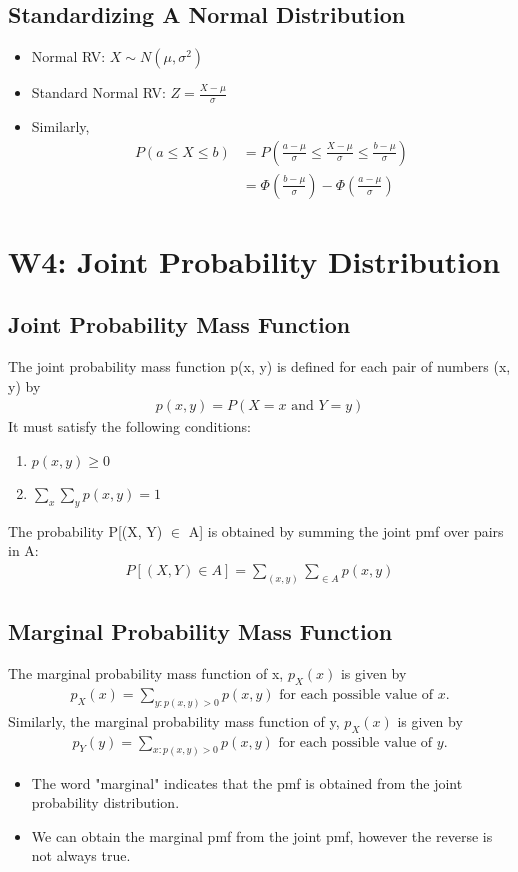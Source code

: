 \documentclass[a4paper]{article}
\begin{document}
\subsection{Standardizing A Normal Distribution}
\begin{itemize}
    \item Normal RV: $X \sim N(\mu, \sigma^{2})$
    \item Standard Normal RV: $Z = \frac{X-\mu}{\sigma}$ 
    \item Similarly,
    \begin{align*}
        P(a \leq X \leq b) &= P\left(\frac{a-\mu}{\sigma}\leq \frac{X-\mu}{\sigma} \leq \frac{b-\mu}{\sigma}\right)\\
        &= \Phi\left(\frac{b-\mu}{\sigma}\right)-\Phi\left(\frac{a-\mu}{\sigma}\right)
    \end{align*}
\end{itemize}
\newpage
\section{W4: Joint Probability Distribution}
\subsection{Joint Probability Mass Function}
The joint probability mass function p(x, y) is defined for each pair of numbers (x, y) by
\begin{align*}
    p(x, y) = P(X = x\text{ and }Y = y)
\end{align*}
It must satisfy the following conditions:
\begin{enumerate}
    \item $p(x, y) \geq 0$
    \item $\sum\limits_{x}\sum\limits_{y}p(x, y) = 1$
\end{enumerate}
The probability P[(X, Y) $\in$ A] is obtained by summing the joint pmf over pairs in A:
\begin{align*}
    P[(X, Y)\in A] = \sum\limits_{(x, y)}\sum\limits_{\in A}p(x, y)
\end{align*}
\subsection{Marginal Probability Mass Function}
The marginal probability mass function of x, $p_{X}(x)$ is given by
\begin{align*}
    p_{X}(x) = \sum\limits_{y: p(x, y)> 0} p(x, y)\text{ for each possible value of }x.
\end{align*}
Similarly, the marginal probability mass function of y, $p_{X}(x)$ is given by
\begin{align*}
    p_{Y}(y) = \sum\limits_{x: p(x, y)> 0} p(x, y)\text{ for each possible value of }y.
\end{align*}
\begin{itemize}
    \item The word "marginal" indicates that the pmf is obtained from the joint probability distribution.
    \item We can obtain the marginal pmf from the joint pmf, however the reverse is not always true.
\end{itemize} 
\end{document}
